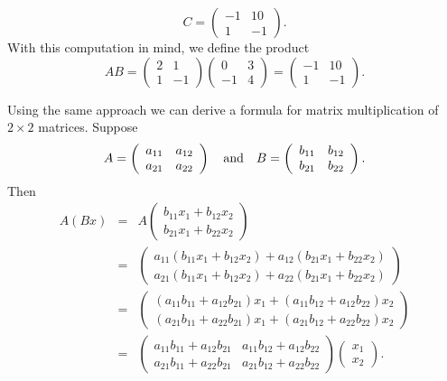 \documentclass{ximera}
\begin{document}
\[
C =\left(\begin{array}{rr} -1 & 10 \\ 1 & -1 \end{array}\right).
\]
With this computation in mind, we define the product
\[
AB =
\left(\begin{array}{rr} 2 & 1\\ 1 & -1\end{array}\right)
\left(\begin{array}{rr} 0 & 3\\ -1 & 4\end{array}\right)
= \left(\begin{array}{rr} -1 & 10 \\ 1 & -1 \end{array}\right).
\]

Using the same approach we can derive a formula for matrix
multiplication of $2\times 2$ matrices.  Suppose
\[
A= \left(\begin{array}{rr} a_{11} & a_{12}\\ a_{21} &
a_{22}\end{array}\right)
\quad\mbox{and}\quad
B= \left(\begin{array}{rr} b_{11} & b_{12}\\ b_{21} &
b_{22}\end{array}\right).
\]
Then
\begin{eqnarray*}
A(Bx) & = & A \left(\begin{array}{c} b_{11}x_1+b_{12}x_2 \\
b_{21}x_1+b_{22}x_2 \end{array}\right)\\
 & = & \left(\begin{array}{c} a_{11}(b_{11}x_1+b_{12}x_2)
+a_{12}(b_{21}x_1+b_{22}x_2)  \\
a_{21}(b_{11}x_1+b_{12}x_2) +
a_{22}(b_{21}x_1+b_{22}x_2) \end{array}\right) \\
 & = & \left(\begin{array}{c} (a_{11}b_{11}+a_{12}b_{21})x_1+
(a_{11}b_{12}+a_{12}b_{22})x_2  \\
(a_{21}b_{11}+a_{22}b_{21})x_1+
(a_{21}b_{12}+a_{22}b_{22})x_2 \end{array}\right) \\
& = & \left(\begin{array}{rr} a_{11}b_{11}+a_{12}b_{21} &
a_{11}b_{12}+a_{12}b_{22}\\
a_{21}b_{11}+a_{22}b_{21} & a_{21}b_{12}+a_{22}b_{22}
\end{array}\right)
        \left(\begin{array}{c} x_1 \\ x_2 \end{array} \right).
\end{eqnarray*}
\end{document}
